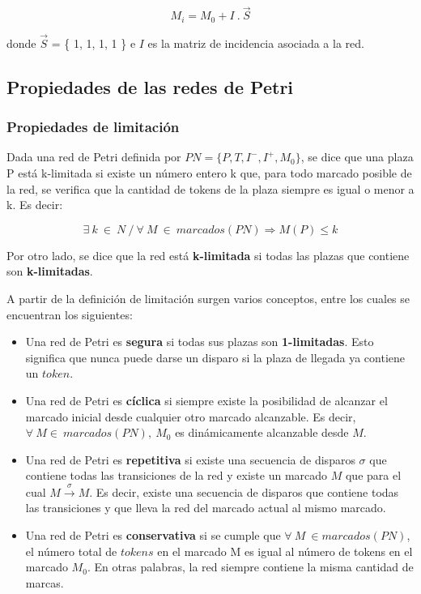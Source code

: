 \begin{equation}
    M_i = M_0 + I \ . \ \vec{S}
\end{equation}

\noindent donde $\vec{S}$ = \{ 1, 1, 1, 1 \} e $I$ es la matriz de incidencia asociada a la red.

\subsection{Propiedades de las redes de Petri}
\subsubsection{Propiedades de limitación}
Dada una red de Petri definida por $PN = \{ P, T, I^-, I^+, M_0 \}$, se dice que una plaza P está k-limitada si existe un número entero k que, para todo marcado posible de la red, se verifica que la cantidad de tokens de la plaza siempre es igual o menor a k. Es decir:

\begin{equation}
    \exists \ k \ \in \ N \ / \ \forall \ M \ \in \ marcados (PN) \Rightarrow M(P) \leq k
\end{equation}

\noindent Por otro lado, se dice que la red está \textbf{k-limitada} si todas las plazas que contiene son \textbf{k-limitadas}. \\ \par

A partir de la definición de limitación surgen varios conceptos, entre los cuales se encuentran los siguientes:
\begin{itemize}
    \item Una red de Petri es \textbf{segura} si todas sus plazas son \textbf{1-limitadas}. Esto significa que nunca puede darse un disparo si la plaza de llegada ya contiene un $token$.
    \item Una red de Petri es \textbf{cíclica} si siempre existe la posibilidad de alcanzar el marcado inicial desde cualquier otro marcado alcanzable. Es decir, \break $\forall \ M  \in \ marcados(PN),\ M_0$ es dinámicamente alcanzable desde $M$.
    \item Una red de Petri es \textbf{repetitiva} si existe una secuencia de disparos $\sigma$ que contiene todas las transiciones de la red y existe un marcado $M$ que para el cual $M \xrightarrow{\sigma} M$. Es decir, existe una secuencia de disparos que contiene todas las transiciones y que lleva la red del marcado actual al mismo marcado.
    \item  Una red de Petri es \textbf{conservativa} si se cumple que $\forall \ M\ \in marcados (PN)$, el número total de $tokens$ en el marcado M es igual al número de tokens en el marcado $M_0$. En otras palabras, la red siempre contiene la misma cantidad de marcas.
\end{itemize}

